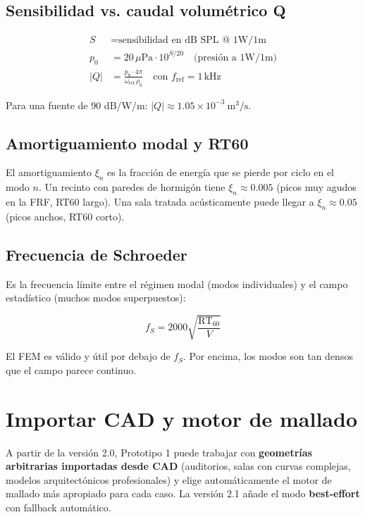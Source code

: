 \documentclass[11pt, a4paper]{article}
\begin{document}
\subsection{Sensibilidad vs. caudal volumétrico Q}

\begin{align*}
  S &= \text{sensibilidad en dB SPL @ 1W/1m} \\
  p_0 &= 20\,\mu\text{Pa} \cdot 10^{S/20} \quad \text{(presión a 1W/1m)} \\
  |Q| &= \frac{p_0 \cdot 4\pi}{\omega_\text{ref}\,\rho_0}
         \quad \text{con } f_\text{ref} = 1\,\text{kHz}
\end{align*}

Para una fuente de 90 dB/W/m: $|Q| \approx 1.05 \times 10^{-3}\ \text{m}^3/\text{s}$.

\subsection{Amortiguamiento modal y RT60}

El amortiguamiento $\xi_n$ es la fracción de energía que se pierde por ciclo
en el modo $n$. Un recinto con paredes de hormigón tiene $\xi_n \approx 0.005$
(picos muy agudos en la FRF, RT60 largo). Una sala tratada acústicamente puede
llegar a $\xi_n \approx 0.05$ (picos anchos, RT60 corto).

\subsection{Frecuencia de Schroeder}

Es la frecuencia límite entre el régimen modal (modos individuales) y el campo
estadístico (muchos modos superpuestos):

\[
  f_S = 2000 \sqrt{\frac{\text{RT}_{60}}{V}}
\]

El FEM es válido y útil por debajo de $f_S$. Por encima, los modos son tan
densos que el campo parece continuo.

\section{Importar CAD y motor de mallado}

A partir de la versión 2.0, Prototipo 1 puede trabajar con \textbf{geometrías
arbitrarias importadas desde CAD} (auditorios, salas con curvas complejas,
modelos arquitectónicos profesionales) y elige automáticamente el motor de
mallado más apropiado para cada caso. La versión 2.1 añade el modo
\textbf{best-effort} con fallback automático.
\end{document}
